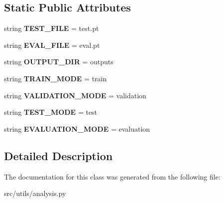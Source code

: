 \subsection*{Static Public Attributes}
\begin{DoxyCompactItemize}
\item 
string {\bfseries T\+E\+S\+T\+\_\+\+F\+I\+LE} = \textquotesingle{}test.\+pt\textquotesingle{}\hypertarget{classanalysis_1_1Analyzer_a5ba821b80838b7b94c7ed5e90f29f50d}{}\label{classanalysis_1_1Analyzer_a5ba821b80838b7b94c7ed5e90f29f50d}

\item 
string {\bfseries E\+V\+A\+L\+\_\+\+F\+I\+LE} = \textquotesingle{}eval.\+pt\textquotesingle{}\hypertarget{classanalysis_1_1Analyzer_a43467316054aac4a8431653aabc3048d}{}\label{classanalysis_1_1Analyzer_a43467316054aac4a8431653aabc3048d}

\item 
string {\bfseries O\+U\+T\+P\+U\+T\+\_\+\+D\+IR} = \textquotesingle{}outputs\textquotesingle{}\hypertarget{classanalysis_1_1Analyzer_ae639170ee9cec8f748c2b56f8e62b8ca}{}\label{classanalysis_1_1Analyzer_ae639170ee9cec8f748c2b56f8e62b8ca}

\item 
string {\bfseries T\+R\+A\+I\+N\+\_\+\+M\+O\+DE} = \textquotesingle{}train\textquotesingle{}\hypertarget{classanalysis_1_1Analyzer_a6d013c22abf2ccb3d3c54d88c5776a9c}{}\label{classanalysis_1_1Analyzer_a6d013c22abf2ccb3d3c54d88c5776a9c}

\item 
string {\bfseries V\+A\+L\+I\+D\+A\+T\+I\+O\+N\+\_\+\+M\+O\+DE} = \textquotesingle{}validation\textquotesingle{}\hypertarget{classanalysis_1_1Analyzer_a76be0f0e67007845576c35ddbe07db90}{}\label{classanalysis_1_1Analyzer_a76be0f0e67007845576c35ddbe07db90}

\item 
string {\bfseries T\+E\+S\+T\+\_\+\+M\+O\+DE} = \textquotesingle{}test\textquotesingle{}\hypertarget{classanalysis_1_1Analyzer_a67fe7bc673b4765058c728f4b57298da}{}\label{classanalysis_1_1Analyzer_a67fe7bc673b4765058c728f4b57298da}

\item 
string {\bfseries E\+V\+A\+L\+U\+A\+T\+I\+O\+N\+\_\+\+M\+O\+DE} = \textquotesingle{}evaluation\textquotesingle{}\hypertarget{classanalysis_1_1Analyzer_afc7581bdcfed5babeb60ba0859ef64ee}{}\label{classanalysis_1_1Analyzer_afc7581bdcfed5babeb60ba0859ef64ee}

\end{DoxyCompactItemize}


\subsection{Detailed Description}
\begin{DoxyVerb}\end{DoxyVerb}
 

The documentation for this class was generated from the following file\+:\begin{DoxyCompactItemize}
\item 
src/utils/analysis.\+py\end{DoxyCompactItemize}

